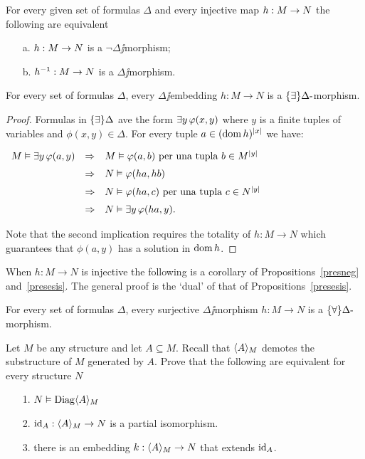 \documentclass[creche.tex]{subfiles}
\begin{document}
\begin{proposition}\label{presneg}
For every given set of formulas $\Delta$ and every injective map $h:M\rightarrow N$ the following are equivalent
\begin{itemize}
\item[a.] $h:M\rightarrow N$ is a $\neg\Delta\jj$morphism;
\item[b.] $h^{-1}:M\rightarrow N$ is a $\Delta\jj$morphism.\QED
\end{itemize}
\end{proposition}

\begin{proposition}\label{presesis}
For every set of formulas $\Delta$, every $\Delta\jj$embedding $h:M\to N$ is a $\{\exists\}\Delta\mbox{-}$mor\-phism.
\end{proposition}
\begin{proof}
Formulas in $\{\exists\}\Delta$ ave the form $\exists y\,\varphi(x,y)$ where $y$ is a finite tuples of variables and  $\phi(x,y)\in\Delta$. For every tuple $a\in(\mathop{\rm dom} h)^{|x|}$ we have:

\hfil
$\begin{array}{rcl}
M\models\E y\,\phi(a,y) %
&\IMP& M\models\phi(a,b)\textrm{ per una tupla } b\in M^{|y|}  \\[2mm]
&\IMP& N\models\phi(ha,hb) \\[2mm]
&\IMP& N\models\phi(ha,c)\textrm{ per una tupla } c\in N^{|y|}  \\[2mm]
&\IMP& N\models\E y\,\phi(ha,y).\\
\end{array}$

Note that the second implication requires the totality of  $h:M\to N$ which guarantees that $\phi(a,y)$ has a solution in $\mathop{\rm dom} h$.
\end{proof}

When $h:M\to N$ is injective the following is a corollary of Propositions~\ref{presneg} and~\ref{presesis}. The general proof is the `dual' of that of Propositions~\ref{presesis}.

\begin{proposition}\label{presuniv}
For every set of formulas $\Delta$, every surjective $\Delta\jj$morphism $h:M\to N$ is a $\{\forall\}\Delta\mbox{-}$mor\-phism.\QED
\end{proposition}

\begin{exercise}\label{ex_diagram}
Let $M$ be any structure and let $A\subseteq M$. Recall that $\langle A\rangle_M$ demotes the substructure of $M$ generated by $A$. Prove that the following are equivalent for every structure $N$
\begin{itemize}
\item[1.] $N\vDash{\rm Diag}\langle A\rangle_M$
\item[2.] $\textrm{id}_A:\langle A\rangle_M\to N$ is a partial isomorphism.
\item[3.] there is an embedding $k:\langle A\rangle_M\to N$ that extends $\textrm{id}_A$.
\end{itemize}
\end{exercise}
\end{document}

